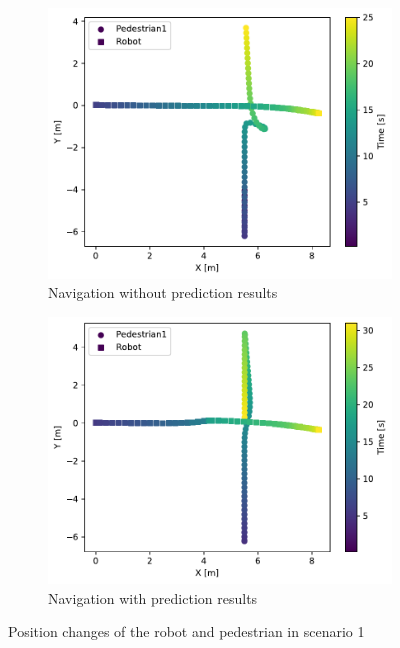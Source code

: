 \begin{figure}[H]
  \centering
  \begin{subfigure}{0.8\textwidth}
    \centering
    \includegraphics[keepaspectratio, scale=0.75]{images/cross_normal3.pdf}
    \caption{Navigation without prediction results}
    \label{Fig:cross-normal}
  \end{subfigure}
  \vfill
  \begin{subfigure}{0.8\textwidth}
    \centering
    \includegraphics[keepaspectratio, scale=0.75]{images/cross_pred.pdf}
    \caption{Navigation with prediction results}
    \label{Fig:cross-pred}
  \end{subfigure}
  \caption{Position changes of the robot and pedestrian in scenario 1}
  \label{Fig:cross-viz}
\end{figure}

